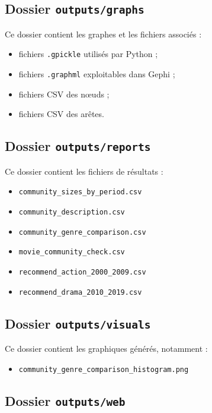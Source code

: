 \documentclass[11pt,a4paper,oneside,openany]{report}
\begin{document}
\subsection{Dossier \texttt{outputs/graphs}}

Ce dossier contient les graphes et les fichiers associés :

\begin{itemize}
    \item fichiers \texttt{.gpickle} utilisés par Python ;
    \item fichiers \texttt{.graphml} exploitables dans Gephi ;
    \item fichiers CSV des nœuds ;
    \item fichiers CSV des arêtes.
\end{itemize}

\subsection{Dossier \texttt{outputs/reports}}

Ce dossier contient les fichiers de résultats :

\begin{itemize}
    \item \texttt{community\_sizes\_by\_period.csv}
    \item \texttt{community\_description.csv}
    \item \texttt{community\_genre\_comparison.csv}
    \item \texttt{movie\_community\_check.csv}
    \item \texttt{recommend\_action\_2000\_2009.csv}
    \item \texttt{recommend\_drama\_2010\_2019.csv}
\end{itemize}

\subsection{Dossier \texttt{outputs/visuals}}

Ce dossier contient les graphiques générés, notamment :

\begin{itemize}
    \item \texttt{community\_genre\_comparison\_histogram.png}
\end{itemize}

\subsection{Dossier \texttt{outputs/web}}
\end{document}
